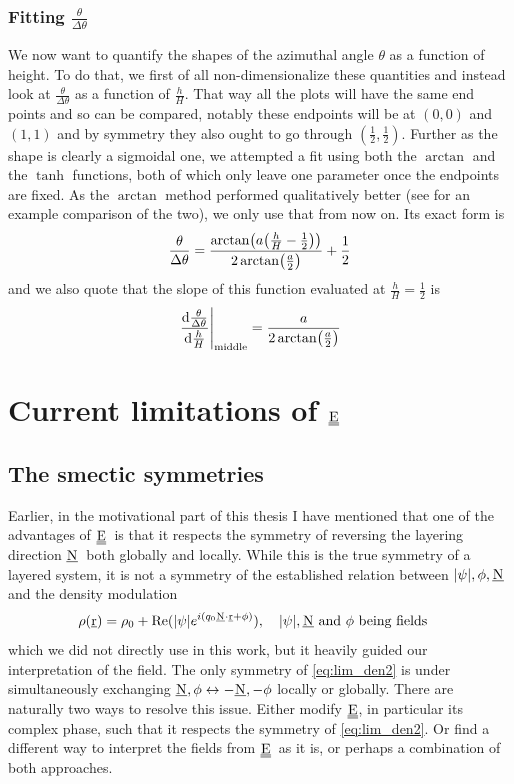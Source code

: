 \documentclass[12pt]{article}
\newcommand\barbelow[1]{\stackunder[1pt]{#1}{\rule{\widthof{#1}*\real{1.1}}{.1ex}}}
\newcommand\twobarsbelow[1]{\stackunder[1pt]{\barbelow{#1}}{\rule{\widthof{#1}*\real{1.1}}{.1ex}}}
\newcommand{\su}[1]{\barbelow{#1}}
\newcommand{\du}[1]{\twobarsbelow{#1}}
\newcommand{\ssu}[1]{\scriptsize\barbelow{#1}\normalsize}
\newcommand{\NN}{$\su{N}$}
\newcommand{\EE}{$\du{E}$}
\begin{document}
\subsubsection{Fitting $\frac{\theta}{\Delta\theta}$}
We now want to quantify the shapes of the azimuthal angle $\theta$ as a function of height.
To do that, we first of all non-dimensionalize these quantities and instead look at $\frac{\theta}{\Delta\theta}$ as a function of $\frac{h}{H}$.
That way all the plots will have the same end points and so can be compared, notably these endpoints will be at $(0, 0)$ and $(1, 1)$ and by symmetry they also ought to go through $(\frac{1}{2}, \frac{1}{2})$.
Further as the shape is clearly a sigmoidal one, we attempted a fit using both the $\arctan$ and the $\tanh$ functions, both of which only leave one parameter once the endpoints are fixed.
As the $\arctan$ method performed qualitatively better (see  for an example comparison of the two), we only use that from now on.
Its exact form is
\begin{equation}
    \frac{\theta}{\Delta\theta} = \frac{\arctan(a \qty(\frac{h}{H} - \frac{1}{2}))}{2\arctan(\frac{a}{2})} + \frac{1}{2}
\end{equation}
and we also quote that the slope of this function evaluated at $\frac{h}{H} = \frac{1}{2}$ is
\begin{equation}
    \eval{\dv{\frac{\theta}{\Delta\theta}}{\frac{h}{H}}}_\text{middle} = \frac{a}{2\arctan(\frac{a}{2})}
\end{equation}

\section{Current limitations of \EE}
\subsection{The smectic symmetries}
Earlier, in the motivational part of this thesis I have mentioned that one of the advantages of \EE\ is that it respects the symmetry of reversing the layering direction \NN\ both globally and locally.
While this is the true symmetry of a layered system, it is not a symmetry of the established relation between $|\psi|,\phi,\su{N}$ and the density modulation
\begin{equation}\label{eq:lim_den2}
    \rho(\su{r}) = \rho_0 + \Re(|\psi| e^{i(q_0\ssu{N}\cdot\ssu{r} + \phi)}), \qq{$|\psi|,\su{N}$ and $\phi$ being fields}
\end{equation}
which we did not directly use in this work, but it heavily guided our interpretation of the field.
The only symmetry of \cref{eq:lim_den2} is under simultaneously exchanging $\su{N}, \phi \leftrightarrow -\su{N}, -\phi$ locally or globally.
There are naturally two ways to resolve this issue.
Either modify \EE, in particular its complex phase, such that it respects the symmetry of \cref{eq:lim_den2}.
Or find a different way to interpret the fields from \EE\ as it is, or perhaps a combination of both approaches.
\end{document}

